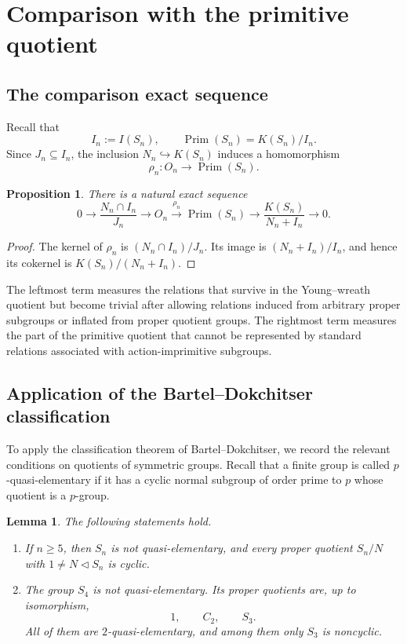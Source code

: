\documentclass[a4paper,11pt]{article}
\numberwithin{equation}{section}
\newtheorem{proposition}[theorem]{Proposition}
\newtheorem{lemma}[theorem]{Lemma}
\newcommand{\Prim}{\operatorname{Prim}}
\begin{document}
\section{Comparison with the primitive quotient}\label{sec:primitive-comparison}

\subsection{The comparison exact sequence}

Recall that
\[
  I_n:=I(S_n),
  \qquad
  \Prim(S_n)=K(S_n)/I_n.
\]
Since $J_n\subseteq I_n$, the inclusion $N_n\hookrightarrow K(S_n)$ induces a
homomorphism
\[
  \rho_n:O_n\longrightarrow\Prim(S_n).
\]

\begin{proposition}\label{prop:difference-sequence}
There is a natural exact sequence
\[
  0\longrightarrow\frac{N_n\cap I_n}{J_n}
  \longrightarrow O_n\xrightarrow{\rho_n}\Prim(S_n)
  \longrightarrow\frac{K(S_n)}{N_n+I_n}\longrightarrow0.
\]
\end{proposition}

\begin{proof}
The kernel of $\rho_n$ is $(N_n\cap I_n)/J_n$. Its image is
$(N_n+I_n)/I_n$, and hence its cokernel is $K(S_n)/(N_n+I_n)$.
\end{proof}

The leftmost term measures the relations that survive in the Young--wreath
quotient but become trivial after allowing relations induced from arbitrary
proper subgroups or inflated from proper quotient groups. The rightmost term
measures the part of the primitive quotient that cannot be represented by
standard relations associated with action-imprimitive subgroups.

\subsection{Application of the Bartel--Dokchitser classification}

To apply the classification theorem of Bartel--Dokchitser, we record the
relevant conditions on quotients of symmetric groups. Recall that a finite
group is called $p$-quasi-elementary if it has a cyclic normal subgroup of
order prime to $p$ whose quotient is a $p$-group.

\begin{lemma}\label{lem:BD-application}
The following statements hold.
\begin{enumerate}[label=\textup{(\roman*)},leftmargin=3em,labelsep=0.6em]
\item If $n\ge5$, then $S_n$ is not quasi-elementary, and every proper quotient
      $S_n/N$ with $1\ne N\triangleleft S_n$ is cyclic.
\item The group $S_4$ is not quasi-elementary. Its proper quotients are, up to
      isomorphism,
      \[
        1,\qquad C_2,\qquad S_3.
      \]
      All of them are $2$-quasi-elementary, and among them only $S_3$ is
      noncyclic.
\end{enumerate}
\end{lemma}
\end{document}
